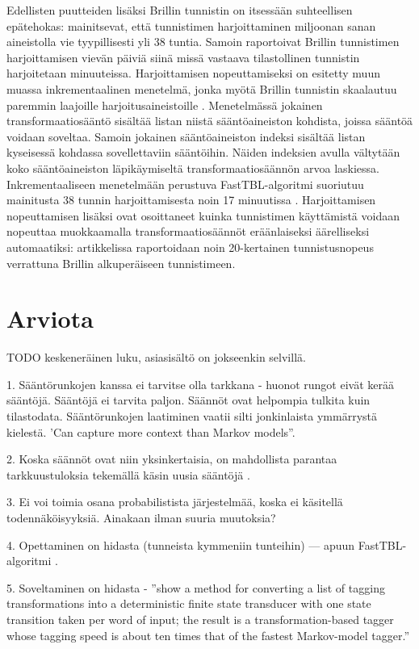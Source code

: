 \documentclass[utf8,bachelor,manualbib]{gradu3}
\begin{document}
Edellisten puutteiden lisäksi Brillin tunnistin on itsessään suhteellisen epätehokas:  mainitsevat, että tunnistimen harjoittaminen miljoonan sanan aineistolla vie tyypillisesti yli 38 tuntia. Samoin  raportoivat Brillin tunnistimen harjoittamisen vievän päiviä siinä missä vastaava tilastollinen tunnistin harjoitetaan minuuteissa. Harjoittamisen nopeuttamiseksi on esitetty muun muassa inkrementaalinen menetelmä, jonka myötä Brillin tunnistin skaalautuu paremmin laajoille harjoitusaineistoille \citep{ramshaw1994}. Menetelmässä jokainen transformaatiosääntö sisältää listan niistä sääntöaineiston kohdista, joissa sääntöä voidaan soveltaa. Samoin jokainen sääntöaineiston indeksi sisältää listan kyseisessä kohdassa sovellettaviin sääntöihin. Näiden indeksien avulla vältytään koko  sääntöaineiston läpikäymiseltä transformaatiosäännön arvoa laskiessa. Inkrementaaliseen menetelmään perustuva FastTBL-algoritmi suoriutuu mainitusta 38 tunnin harjoittamisesta noin 17 minuutissa \citep{ngai2001}. Harjoittamisen nopeuttamisen lisäksi  ovat osoittaneet kuinka tunnistimen käyttämistä voidaan nopeuttaa muokkaamalla transformaatiosäännöt eräänlaiseksi äärelliseksi automaatiksi: artikkelissa raportoidaan noin 20-kertainen tunnistusnopeus verrattuna Brillin alkuperäiseen tunnistimeen.


\section{Arviota}
TODO keskeneräinen luku, asiasisältö on jokseenkin selvillä.

1. Sääntörunkojen kanssa ei tarvitse olla tarkkana - huonot rungot eivät kerää sääntöjä. Sääntöjä ei tarvita paljon. Säännöt ovat helpompia tulkita kuin tilastodata. Sääntörunkojen laatiminen vaatii silti jonkinlaista ymmärrystä kielestä. 'Can capture more context than Markov models''.

2. Koska säännöt ovat niin yksinkertaisia, on mahdollista parantaa tarkkuustuloksia tekemällä käsin uusia sääntöjä \citep{volk1998}.

3. Ei voi toimia osana probabilistista järjestelmää, koska ei käsitellä todennäköisyyksiä. Ainakaan ilman suuria muutoksia?

4. Opettaminen on hidasta (tunneista kymmeniin tunteihin) --- apuun FastTBL-algoritmi \citep{ngai2001}.

5. Soveltaminen on hidasta - ''show a method for converting a list of tagging transformations into a deterministic finite state transducer with one state transition taken per word of input; the result is a transformation-based tagger whose tagging speed is about ten times that of the fastest Markov-model tagger.'' \citep{roche1995}
\end{document}
